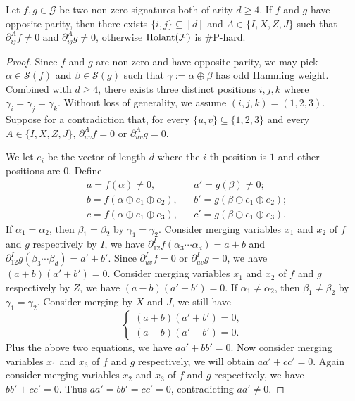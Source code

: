 \begin{lemma}\label{lm: non-zero Bell contraction}
    Let $f,g\in \mathcal{G}$ be two non-zero signatures both of arity $d\ge 4$.
    If $f$ and $g$ have opposite parity, 
    then there exists $\{i,j\}\subseteq [d]$ and $A\in \{I,X,Z,J\}$ such that $\partial_{ij}^Af\neq 0$ and $\partial_{ij}^Ag\neq 0$, otherwise $\operatorname{Holant}(\mathcal{F})$ is \#P-hard.
\end{lemma}
\begin{proof}
    Since $f$ and $g$ are non-zero and have opposite parity, we may pick $\alpha\in \mathscr{S}(f)$ and $\beta\in \mathscr{S}(g)$ such that $\gamma:=\alpha\oplus \beta$ has odd Hamming weight.
    Combined with $d\ge 4$, there exists three distinct positions $i,j,k$ where $\gamma_i=\gamma_j=\gamma_k.$
    Without loss of generality, we assume $(i,j,k)=(1,2,3).$
    Suppose for a contradiction that, for every $\{u,v\}\subseteq \{1,2,3\}$ and every $A\in\{I,X,Z,J\}$, $\partial_{uv}^Af=0$ or $\partial_{uv}^Ag=0$.
    
    We let $e_i$ be the vector of length $d$ where the $i$-th position is $1$ and other positions are $0$.
    Define 
    \begin{equation*}
        \begin{aligned}
            &a=f(\alpha)\neq 0,&
            &a'=g(\beta)\neq 0;\\
            &b=f(\alpha\oplus e_1\oplus e_2),
            &&b'=g(\beta\oplus e_1\oplus e_2);\\
            &c=f(\alpha\oplus e_1\oplus e_3),
            &&c'=g(\beta\oplus e_1\oplus e_3).
        \end{aligned}
    \end{equation*}
    If $\alpha_1=\alpha_2$, then $\beta_1=\beta_2$ by $\gamma_1=\gamma_2$.
    Consider merging variables $x_1$ and $x_2$ of $f$ and $g$ respectively by $I$,
    we have $\partial_{12}^If(\alpha_3\cdots\alpha_d)=a+b$ and $\partial_{12}^Ig(\beta_3\cdots\beta_d)=a'+b'$.
    Since $\partial_{uv}^If=0$ or $\partial_{uv}^Ig=0$, we have $(a+b)(a'+b')=0$.
    Consider merging variables $x_1$ and $x_2$ of $f$ and $g$ respectively by $Z$, we have $(a-b)(a'-b')=0$.
    If $\alpha_1\neq \alpha_2$, then $\beta_1\neq \beta_2$ by $\gamma_1=\gamma_2.$
    Consider merging by $X$ and $J$, we still have
    $$
    \begin{cases}
        (a+b)(a'+b')=0,\\
        (a-b)(a'-b')=0.
    \end{cases}
    $$
    Plus the above two equations, we have $aa'+bb'=0.$
    Now consider merging variables $x_1$ and $x_3$ of $f$ and $g$ respectively, we will obtain $aa'+cc'=0.$
    Again consider merging variables $x_2$ and $x_3$ of $f$ and $g$ respectively, we have
    $bb'+cc'=0.$
    Thus $aa'=bb'=cc'=0$, contradicting $aa'\neq 0.$
\end{proof}

